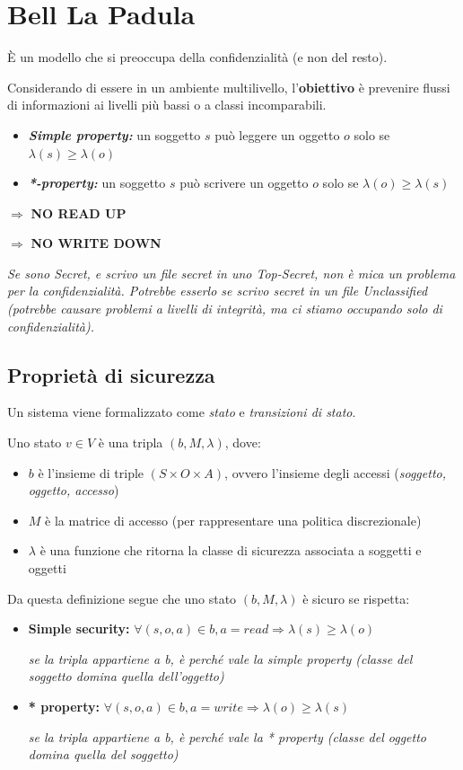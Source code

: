 \documentclass{report}
\begin{document}
\section{Bell La Padula}
È un modello che si preoccupa della confidenzialità (e non del resto).

\noindent Considerando di essere in un ambiente multilivello, l'\textbf{obiettivo} è 
prevenire flussi di informazioni ai livelli più bassi o a classi incomparabili.

\begin{itemize}
    \item \textbf{\textit{Simple property:}} un soggetto $s$ può leggere un oggetto 
    $o$ solo se $\lambda(s) \geq \lambda(o)$
    \item \textbf{\textit{*-property:}} un soggetto $s$ può scrivere un oggetto $o$ solo 
    se $\lambda(o) \geq \lambda(s)$
\end{itemize}

$\Rightarrow$ \textbf{NO READ UP}

$\Rightarrow$ \textbf{NO WRITE DOWN}

\noindent \textit{Se sono Secret, e scrivo un file secret in uno Top-Secret, non è mica un problema 
per la confidenzialità. Potrebbe esserlo se scrivo secret in un file Unclassified (potrebbe causare problemi a livelli di integrità, ma ci stiamo occupando solo di confidenzialità).}

\subsection{Proprietà di sicurezza}
Un sistema viene formalizzato come \textit{stato}
e \textit{transizioni di stato}. 

\noindent Uno stato $v \in V$ è una tripla $(b, M, \lambda)$, dove:
\begin{itemize}
    \item $b$ è l'insieme di triple $(S \times O \times A)$, ovvero l'insieme degli accessi (\textit{soggetto, oggetto, accesso})
    \item $M$ è la matrice di accesso (per rappresentare una politica discrezionale)
    \item $\lambda$ è una funzione che ritorna la classe di sicurezza associata a soggetti e oggetti
\end{itemize}

\noindent Da questa definizione segue che uno stato $(b, M, \lambda)$ è sicuro se rispetta:
\begin{itemize}
    \item \textbf{Simple security:} $\forall (s,o,a) \in b, a = read \Rightarrow \lambda(s) \geq \lambda(o)$
    
    \textit{se la tripla appartiene a b, è perché vale la simple property (classe del soggetto domina quella dell'oggetto)}
    \item \textbf{* property:} $\forall (s,o,a) \in b, a = write \Rightarrow \lambda(o) \geq \lambda(s)$
    
    \textit{se la tripla appartiene a b, è perché vale la * property (classe del oggetto domina quella del soggetto)}
\end{itemize}
\end{document}
